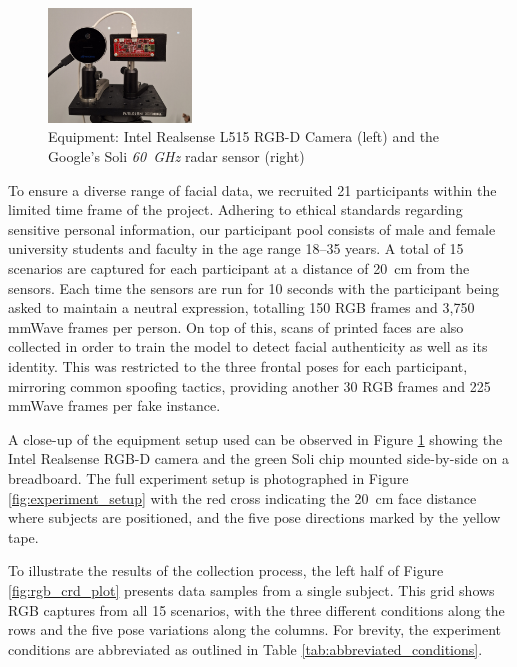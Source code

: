 \documentclass{mpaper}
\begin{document}
\begin{figure}[b!]
    \centering
    \vspace{-0.45cm}
    \includegraphics[width=0.34\textwidth,decodearray={1 1 1 1 1 1}]{figures/equipment.pdf}
    \vspace{0.1cm}
    \caption{Equipment: Intel Realsense L515 RGB-D Camera (left) and the Google's Soli \textit{\qty{60}{\GHz}} radar sensor (right)}
    \label{fig:equipment}
    \vspace{-0.5cm}
\end{figure}

To ensure a diverse range of facial data, we recruited 21 participants within the limited time frame of the project. Adhering to ethical standards regarding sensitive personal information, our participant pool consists of male and female university students and faculty in the age range 18--35 years. A total of 15 scenarios are captured for each participant at a distance of \qty{20}{\cm} from the sensors. Each time the sensors are run for 10 seconds with the participant being asked to maintain a neutral expression, totalling 150 RGB frames and 3,750 mmWave frames per person. On top of this, scans of printed faces are also collected in order to train the model to detect facial authenticity as well as its identity. This was restricted to the three frontal poses for each participant, mirroring common spoofing tactics, providing another 30 RGB frames and 225 mmWave frames per fake instance.

A close-up of the equipment setup used can be observed in Figure \ref{fig:equipment} showing the Intel Realsense RGB-D camera and the green Soli chip mounted side-by-side on a breadboard. The full experiment setup is photographed in Figure \ref{fig:experiment_setup} with the red cross indicating the \qty{20}{\cm} face distance where subjects are positioned, and the five pose directions marked by the yellow tape.

To illustrate the results of the collection process, the left half of Figure \ref{fig:rgb_crd_plot} presents data samples from a single subject. This grid shows RGB captures from all 15 scenarios, with the three different conditions along the rows and the five pose variations along the columns. For brevity, the experiment conditions are abbreviated as outlined in Table \ref{tab:abbreviated_conditions}.
\end{document}
